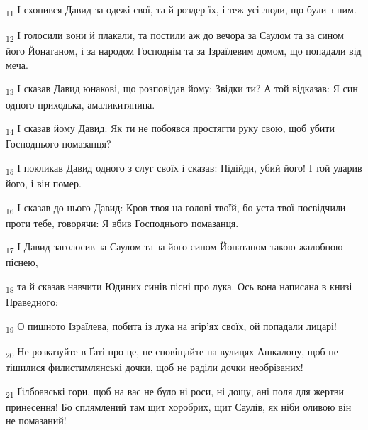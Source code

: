 \begin{tcolorbox}
\textsubscript{11} І схопився Давид за одежі свої, та й роздер їх, і теж усі люди, що були з ним.
\end{tcolorbox}
\begin{tcolorbox}
\textsubscript{12} І голосили вони й плакали, та постили аж до вечора за Саулом та за сином його Йонатаном, і за народом Господнім та за Ізраїлевим домом, що попадали від меча.
\end{tcolorbox}
\begin{tcolorbox}
\textsubscript{13} І сказав Давид юнакові, що розповідав йому: Звідки ти? А той відказав: Я син одного приходька, амаликитянина.
\end{tcolorbox}
\begin{tcolorbox}
\textsubscript{14} І сказав йому Давид: Як ти не побоявся простягти руку свою, щоб убити Господнього помазанця?
\end{tcolorbox}
\begin{tcolorbox}
\textsubscript{15} І покликав Давид одного з слуг своїх і сказав: Підійди, убий його! І той ударив його, і він помер.
\end{tcolorbox}
\begin{tcolorbox}
\textsubscript{16} І сказав до нього Давид: Кров твоя на голові твоїй, бо уста твої посвідчили проти тебе, говорячи: Я вбив Господнього помазанця.
\end{tcolorbox}
\begin{tcolorbox}
\textsubscript{17} І Давид заголосив за Саулом та за його сином Йонатаном такою жалобною піснею,
\end{tcolorbox}
\begin{tcolorbox}
\textsubscript{18} та й сказав навчити Юдиних синів пісні про лука. Ось вона написана в книзі Праведного:
\end{tcolorbox}
\begin{tcolorbox}
\textsubscript{19} О пишното Ізраїлева, побита із лука на згір'ях своїх, ой попадали лицарі!
\end{tcolorbox}
\begin{tcolorbox}
\textsubscript{20} Не розказуйте в Ґаті про це, не сповіщайте на вулицях Ашкалону, щоб не тішилися филистимлянські дочки, щоб не раділи дочки необрізаних!
\end{tcolorbox}
\begin{tcolorbox}
\textsubscript{21} Ґілбоавські гори, щоб на вас не було ні роси, ні дощу, ані поля для жертви принесення! Бо сплямлений там щит хоробрих, щит Саулів, як ніби оливою він не помазаний!
\end{tcolorbox}
